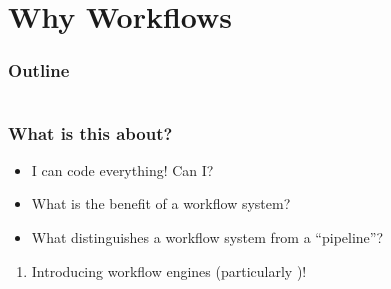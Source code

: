 \section{Why Workflows}

\begin{frame}
    \frametitle{Outline}
    \begin{columns}[t]
        \begin{column}{.5\textwidth}
            \tableofcontents[sections={1-9},currentsection]
        \end{column}
        \begin{column}{.5\textwidth}
            \tableofcontents[sections={10-18},currentsection]
        \end{column}
    \end{columns}
\end{frame}

\begin{frame}
  \frametitle{What is this about?}
   \begin{question}[Questions]
   	 \begin{itemize}
        \item I can code everything! Can I?
        \item What is the benefit of a workflow system?
        \item What distinguishes a workflow system from a ``pipeline''?
     \end{itemize}
   \end{question}
   \begin{docs}[Objectives]
   	  \begin{enumerate}
         \item Introducing workflow engines (particularly \Snakemake)!
      \end{enumerate}
   \end{docs}
\end{frame}  

